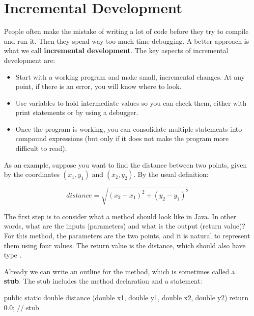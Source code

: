 \section{Incremental Development}
\label{distance}


People often make the mistake of writing a lot of code before they try to compile and run it.
Then they spend way too much time debugging.
A better approach is what we call {\bf incremental development}.
The key aspects of incremental development are:

\begin{itemize}

\item Start with a working program and make small, incremental changes.
At any point, if there is an error, you will know where to look.

\item Use variables to hold intermediate values so you can check them, either with print statements or by using a debugger.

\item Once the program is working, you can consolidate multiple statements into compound expressions (but only if it does not make the program more difficult to read).

\end{itemize}

As an example, suppose you want to find the distance between two points, given by the coordinates $(x_1, y_1)$ and $(x_2, y_2)$.
By the usual definition:

\[ distance = \sqrt{(x_2 - x_1)^2 +(y_2 - y_1)^2} \]

The first step is to consider what a  method should look like in Java.
In other words, what are the inputs (parameters) and what is the output (return value)?
For this method, the parameters are the two points, and it is natural to represent them using four  values.
The return value is the distance, which should also have type .


Already we can write an outline for the method, which is sometimes called a {\bf stub}.
The stub includes the method declaration and a  statement:

\begin{code}
public static double distance
        (double x1, double y1, double x2, double y2) {
    return 0.0;  // stub
}
\end{code}

